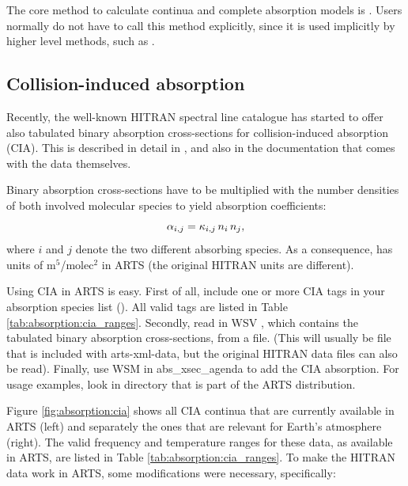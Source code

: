 The core method to calculate continua and complete absorption models
is .  Users normally do not
have to call this method explicitly, since it is used implicitly by
higher level methods, such as .

\subsection{Collision-induced absorption}
\label{sec:absorption:cia}

Recently, the well-known HITRAN spectral line catalogue has started to
offer also tabulated binary absorption cross-sections for
collision-induced absorption (CIA).  This is described in detail in
\citet{richard:12}, and also in the documentation that comes with the
data themselves.  

Binary absorption cross-sections
 have to be multiplied with the number densities of both involved
molecular species to yield absorption coefficients:
\begin{equation}
{\alpha}_{i,j} =  {\kappa}_{i,j} \, {n}_{i} \, {n}_{j},
\end{equation}
where $i$ and $j$ denote the two different absorbing species. As a
consequence,  has units of m$^5$/molec$^2$ in ARTS (the
original HITRAN units are different).

Using CIA in ARTS is easy. First of all, include one or more CIA tags
in your absorption species list (). All valid
tags are listed in Table \ref{tab:absorption:cia_ranges}. Secondly,
read in WSV , which contains the tabulated
binary absorption cross-sections, from a file. (This will usually be
file  that is included with
arts-xml-data, but the original HITRAN data files can also be
read). Finally, use WSM  in
abs\_xsec\_agenda to add the CIA absorption. For usage examples, look
in directory  that is part
of the ARTS distribution.

Figure \ref{fig:absorption:cia} shows all CIA continua that are
currently available in ARTS (left) and separately the ones that are
relevant for Earth's atmosphere (right). The valid frequency and
temperature ranges for these data, as available in ARTS, are listed in
Table \ref{tab:absorption:cia_ranges}.  To make the HITRAN data work
in ARTS, some modifications were necessary, specifically:

